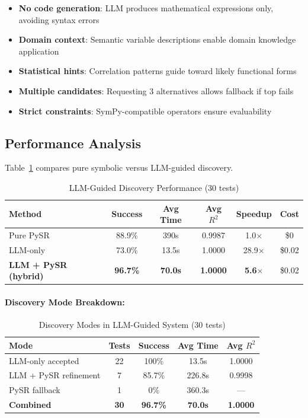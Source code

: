 \documentclass[twoside,11pt]{article}
\begin{document}
\begin{itemize}
\item \textbf{No code generation}: LLM produces mathematical expressions only, avoiding syntax errors
\item \textbf{Domain context}: Semantic variable descriptions enable domain knowledge application
\item \textbf{Statistical hints}: Correlation patterns guide toward likely functional forms
\item \textbf{Multiple candidates}: Requesting 3 alternatives allows fallback if top fails
\item \textbf{Strict constraints}: SymPy-compatible operators ensure evaluability
\end{itemize}

\subsection{Performance Analysis}

Table~\ref{tab:llm_hybrid_performance} compares pure symbolic versus LLM-guided discovery.

\begin{table}[htbp]
\centering
\caption{LLM-Guided Discovery Performance (30 tests)}
\label{tab:llm_hybrid_performance}
\begin{tabular}{@{}lccccc@{}}
\toprule
\textbf{Method} & \textbf{Success} & \textbf{Avg Time} & \textbf{Avg $R^2$} & \textbf{Speedup} & \textbf{Cost} \\
\midrule
Pure PySR & 88.9\% & 390s & 0.9987 & 1.0$\times$ & \$0 \\
LLM-only & 73.0\% & 13.5s & 1.0000 & 28.9$\times$ & \$0.02 \\
\textbf{LLM + PySR (hybrid)} & \textbf{96.7\%} & \textbf{70.0s} & \textbf{1.0000} & \textbf{5.6}$\times$ & \$0.02 \\
\bottomrule
\end{tabular}
\end{table}

\paragraph{Discovery Mode Breakdown:}

\begin{table}[htbp]
\centering
\caption{Discovery Modes in LLM-Guided System (30 tests)}
\label{tab:discovery_modes}
\begin{tabular}{@{}lcccc@{}}
\toprule
\textbf{Mode} & \textbf{Tests} & \textbf{Success} & \textbf{Avg Time} & \textbf{Avg $R^2$} \\
\midrule
LLM-only accepted & 22 & 100\% & 13.5s & 1.0000 \\
LLM + PySR refinement & 7 & 85.7\% & 226.8s & 0.9998 \\
PySR fallback & 1 & 0\% & 360.3s & --- \\
\midrule
\textbf{Combined} & \textbf{30} & \textbf{96.7\%} & \textbf{70.0s} & \textbf{1.0000} \\
\bottomrule
\end{tabular}
\end{table}
\end{document}
